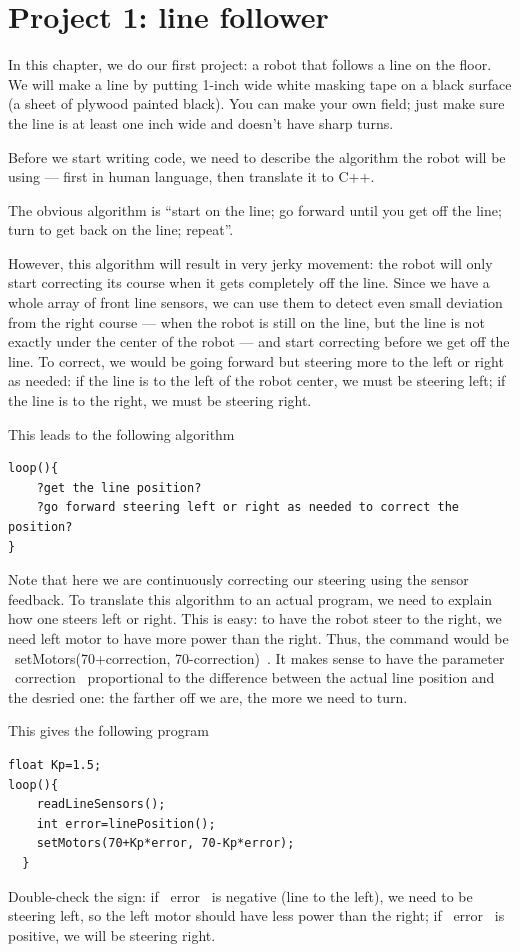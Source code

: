 \documentclass[oneside]{stml-l}
\numberwithin{figure}{chapter}
\begin{document}
\chapter{Project 1: line follower}
In this chapter, we do our first project: a robot that
follows a line on the floor. We will make a line by putting 1-inch wide
white masking tape on a black surface (a sheet of plywood painted black).
You can make your own field; just make sure the line is at least one inch
wide and doesn't have sharp turns.

Before we start writing code, we need to describe the algorithm the robot
will be using --- first in human language, then translate it to C++.

The obvious algorithm is ``start on the line; go forward until you get off
the line; turn to get back on the
line; repeat''.

However, this algorithm will result in very jerky movement: the robot
will only start correcting its course when it gets completely off the line.
Since we have a whole array of front line sensors, we can use them
to detect even small deviation from the right course --- when the robot is still
on the line, but the line is not exactly under the center of the robot --- and start
correcting before we get off the line. To correct, we would be going forward but
steering more to the left or right as needed: if the line is to the left of the robot
center, we must be steering left; if the line is to the right, we must be steering right.

This leads to the following algorithm
\begin{lstlisting}
loop(){
    ?get the line position?
    ?go forward steering left or right as needed to correct the position?
}
\end{lstlisting}

Note that here we are continuously correcting our steering using the sensor
feedback.  To translate this algorithm to an actual program, we need to
explain how one steers left or right.  This is easy: to have the robot
steer to the right, we need left motor to have more power than the right.
Thus, the command would be ~setMotors(70+correction, 70-correction)~.
It makes sense to have the parameter ~correction~  proportional to the
difference between the actual line position and the desried one: the
farther off we are,  the more we need to turn.

This gives the following program
\begin{lstlisting}
float Kp=1.5;
loop(){
    readLineSensors();
    int error=linePosition();
    setMotors(70+Kp*error, 70-Kp*error);
  }
\end{lstlisting}
Double-check the sign: if ~error~ is negative (line to the left), we need to
be steering left, so the left motor should have less  power than the right;
if ~error~ is positive, we will be steering right.
\end{document}
